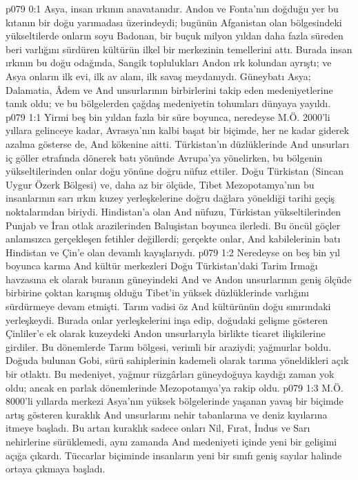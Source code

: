 \vs p079 0:1 Asya, insan ırkının anavatanıdır. Andon ve Fonta’nın doğduğu yer bu kıtanın bir doğu yarımadası üzerindeydi; bugünün Afganistan olan bölgesindeki yükseltilerde onların soyu Badonan, bir buçuk milyon yıldan daha fazla süreden beri varlığını sürdüren kültürün ilkel bir merkezinin temellerini attı. Burada insan ırkının bu doğu odağında, Sangik toplulukları Andon ırk kolundan ayrıştı; ve Asya onların ilk evi, ilk av alanı, ilk savaş meydanıydı. Güneybatı Asya; Dalamatia, Âdem ve And unsurlarının birbirlerini takip eden medeniyetlerine tanık oldu; ve bu bölgelerden çağdaş medeniyetin tohumları dünyaya yayıldı.
\vs p079 1:1 Yirmi beş bin yıldan fazla bir süre boyunca, neredeyse M.Ö. 2000’li yıllara gelinceye kadar, Avrasya’nın kalbi başat bir biçimde, her ne kadar giderek azalma gösterse de, And kökenine aitti. Türkistan’ın düzlüklerinde And unsurları iç göller etrafında dönerek batı yönünde Avrupa’ya yönelirken, bu bölgenin yükseltilerinden onlar doğu yönüne doğru nüfuz ettiler. Doğu Türkistan (Sincan Uygur Özerk Bölgesi) ve, daha az bir ölçüde, Tibet Mezopotamya’nın bu insanlarının sarı ırkın kuzey yerleşkelerine doğru dağlara yöneldiği tarihi geçiş noktalarından biriydi. Hindistan’a olan And nüfuzu, Türkistan yükseltilerinden Punjab ve İran otlak arazilerinden Baluşistan boyunca ilerledi. Bu öncül göçler anlamsızca gerçekleşen fetihler değillerdi; gerçekte onlar, And kabilelerinin batı Hindistan ve Çin’e olan devamlı kayışlarıydı.
\vs p079 1:2 Neredeyse on beş bin yıl boyunca karma And kültür merkezleri Doğu Türkistan’daki Tarim Irmağı havzasına ek olarak buranın güneyindeki And ve Andon unsurlarının geniş ölçüde birbirine çoktan karışmış olduğu Tibet’in yüksek düzlüklerinde varlığını sürdürmeye devam etmişti. Tarım vadisi öz And kültürünün doğu sınırındaki yerleşkeydi. Burada onlar yerleşkelerini inşa edip, doğudaki gelişme gösteren Çinliler’e ek olarak kuzeydeki Andon unsurlarıyla birlikte ticaret ilişkilerine girdiler. Bu dönemlerde Tarım bölgesi, verimli bir araziydi; yağmurlar boldu. Doğuda bulunan Gobi, sürü sahiplerinin kademeli olarak tarıma yöneldikleri açık bir otlaktı. Bu medeniyet, yağmur rüzgârları güneydoğuya kaydığı zaman yok oldu; ancak en parlak dönemlerinde Mezopotamya’ya rakip oldu.
\vs p079 1:3 M.Ö. 8000’li yıllarda merkezi Asya’nın yüksek bölgelerinde yaşanan yavaş bir biçimde artış gösteren kuraklık And unsurlarını nehir tabanlarına ve deniz kıyılarına itmeye başladı. Bu artan kuraklık sadece onları Nil, Fırat, İndus ve Sarı nehirlerine sürüklemedi, aynı zamanda And medeniyeti içinde yeni bir gelişimi açığa çıkardı. Tüccarlar biçiminde insanların yeni bir sınıfı geniş sayılar halinde ortaya çıkmaya başladı.

